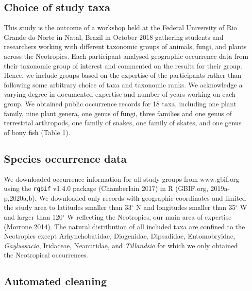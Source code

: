 \documentclass[fleqn,10pt,lineno]{wlpeerj} %
\begin{document}
\hypertarget{choice-of-study-taxa}{%
\subsection*{Choice of study taxa}\label{choice-of-study-taxa}}

This study is the outcome of a workshop held at the Federal University of Rio Grande do Norte in Natal, Brazil in October 2018 gathering students and researchers working with different taxonomic groups of animals, fungi, and plants across the Neotropics. Each participant analysed geographic occurrence data from their taxonomic group of interest and commented on the results for their group. Hence, we include groups based on the expertise of the participants rather than following some arbitrary choice of taxa and taxonomic ranks. We acknowledge a varying degree in documented expertise and number of years working on each group. We obtained public occurrence records for 18 taxa, including one plant family, nine plant genera, one genus of fungi, three families and one genus of terrestrial arthropods, one family of snakes, one family of skates, and one genus of bony fish (Table 1).

\hypertarget{species-occurrence-data}{%
\subsection*{Species occurrence data}\label{species-occurrence-data}}

We downloaded occurrence information for all study groups from www.gbif.org using the \texttt{rgbif} v1.4.0 package (Chamberlain 2017) in R (GBIF.org, 2019a-p,2020a,b). We downloaded only records with geographic coordinates and limited the study area to latitudes smaller than 33\(^\circ\) N and longitudes smaller than 35\(^\circ\) W and larger than 120\(^\circ\) W reflecting the Neotropics, our main area of expertise (Morrone 2014). The natural distribution of all included taxa are confined to the Neotropics except Arhynchobatidae, Diogenidae, Dipsadidae, Entomobryidae, \emph{Gaylussacia}, Iridaceae, Neanuridae, and \emph{Tillandsia} for which we only obtained the Neotropical occurrences.

\hypertarget{automated-cleaning}{%
\subsection*{Automated cleaning}\label{automated-cleaning}}
\end{document}
